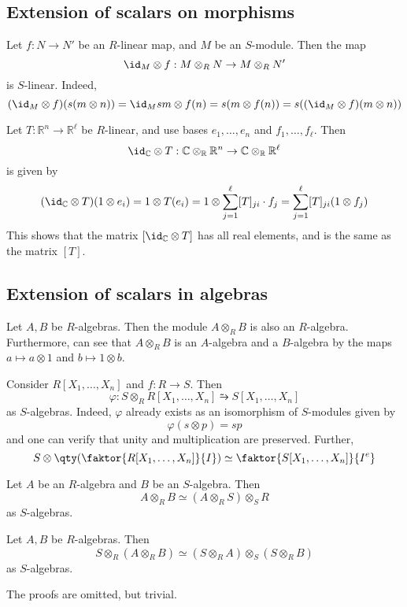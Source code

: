 \subsection{Extension of scalars on morphisms}
Let \( f : N \to N' \) be an \( R \)-linear map, and \( M \) be an \( S \)-module.
Then the map
\[ \id_M \otimes f : M \otimes_R N \to M \otimes_R N' \]
is \( S \)-linear.
Indeed,
\[ (\id_M \otimes f)(s(m \otimes n)) = \id_M sm \otimes f(n) = s(m \otimes f(n)) = s((\id_M \otimes f)(m \otimes n)) \]
\begin{example}
    Let \( T : \mathbb R^n \to \mathbb R^\ell \) be \( R \)-linear, and use bases \( e_1, \dots, e_n \) and \( f_1, \dots, f_\ell \).
    Then
    \[ \id_{\mathbb C} \otimes T : \mathbb C \otimes_{\mathbb R} \mathbb R^n \to \mathbb C \otimes_{\mathbb R} \mathbb R^\ell \]
    is given by
    \[ (\id_{\mathbb C} \otimes T)(1 \otimes e_i) = 1 \otimes T(e_i) = 1 \otimes \sum_{j=1}^\ell [T]_{ji} \cdot f_j = \sum_{j=1}^\ell [T]_{ji} (1 \otimes f_j) \]
    This shows that the matrix \( [\id_{\mathbb C} \otimes T] \) has all real elements, and is the same as the matrix \( [T] \).
\end{example}

\subsection{Extension of scalars in algebras}
Let \( A, B \) be \( R \)-algebras.
Then the module \( A \otimes_R B \) is also an \( R \)-algebra.
Furthermore, can see that \( A \otimes_R B \) is an \( A \)-algebra and a \( B \)-algebra by the maps \( a \mapsto a \otimes 1 \) and \( b \mapsto 1 \otimes b \).
\begin{example}
    Consider \( R[X_1, \dots, X_n] \) and \( f : R \to S \).
    Then
    \[ \varphi : S \otimes_R R[X_1, \dots, X_n] \similarrightarrow S[X_1, \dots, X_n] \]
    as \( S \)-algebras.
    Indeed, \( \varphi \) already exists as an isomorphism of \( S \)-modules given by
    \[ \varphi(s \otimes p) = sp \]
    and one can verify that unity and multiplication are preserved.
    Further,
    \[ S \otimes \qty(\faktor{R[X_1, \dots, X_n]}{I}) \simeq \faktor{S[X_1, \dots, X_n]}{I^e} \]
\end{example}
\begin{proposition}
    Let \( A \) be an \( R \)-algebra and \( B \) be an \( S \)-algebra.
    Then
    \[ A \otimes_R B \simeq (A \otimes_R S) \otimes_S R \]
    as \( S \)-algebras.
\end{proposition}
\begin{proposition}
    Let \( A, B \) be \( R \)-algebras.
    Then
    \[ S \otimes_R (A \otimes_R B) \simeq (S \otimes_R A) \otimes_S (S \otimes_R B) \]
    as \( S \)-algebras.
\end{proposition}
The proofs are omitted, but trivial.

